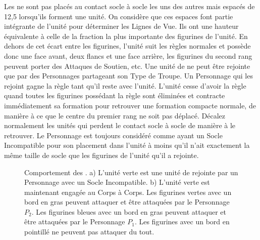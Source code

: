 Les \skirmishers{} ne sont pas placés au contact socle à socle les uns des autres mais espacés de 12,5\unit{}{\milli\meter} lorsqu'ils forment une unité. On considère que ces espaces font partie intégrante de l'unité pour déterminer les Lignes de Vue. Ils ont une hauteur équivalente à celle de la fraction la plus importante des figurines de l'unité. En dehors de cet écart entre les figurines, l'unité suit les règles normales et possède donc une face avant, deux flancs et une face arrière, les figurines du second rang peuvent porter des Attaques de Soutien, etc. Une unité de \skirmishers{} ne peut être rejointe que par des Personnages partageant son Type de Troupe. Un Personnage qui les rejoint gagne la règle \skirmisher{} tant qu'il reste avec l'unité. L'unité cesse d'avoir la règle \skirmisher{} quand toutes les figurines possédant la règle sont éliminées et contracte immédiatement sa formation pour retrouver une formation compacte normale, de manière à ce que le centre du premier rang ne soit pas déplacé. Décalez normalement les unités qui perdent le contact socle à socle de manière à le retrouver. Le Personnage est toujours considéré comme ayant un Socle Incompatible pour son placement dans l'unité à moins qu'il n'ait exactement la même taille de socle que les figurines de l'unité qu'il a rejointe.

\newcommand{\figSkirmiA}{a)}
\newcommand{\figSkirmiB}{b)}
\newcommand{\figSkirmiDist}{\smallfontsize 12,5\unit{}{\milli\meter}}
\newcommand{\figSkirmiCharOne}{$P_{1}$}
\newcommand{\figSkirmiCharTwo}{$P_{2}$}

\begin{figure}[!htbp]
\centering
\hypertarget{skirmishersfigure}{
\def\svgwidth{\textwidth}
}
\caption{Comportement des \skirmishers{}.\vspace*{10pt}\newline
a) L'unité verte est une unité de \skirmishers{} rejointe par un Personnage avec un Socle Incompatible.\vspace*{10pt}\newline
b) L'unité verte est maintenant engagée au Corps à Corps. Les figurines vertes avec un bord en gras peuvent attaquer et être attaquées par le Personnage $ P_{2} $. Les figurines bleues avec un bord en gras peuvent attaquer et être attaquées par le Personnage $ P_{1} $.\newline
Les figurines avec un bord en pointillé ne peuvent pas attaquer du tout.}
\label{figure/skirmishers}
\end{figure}

